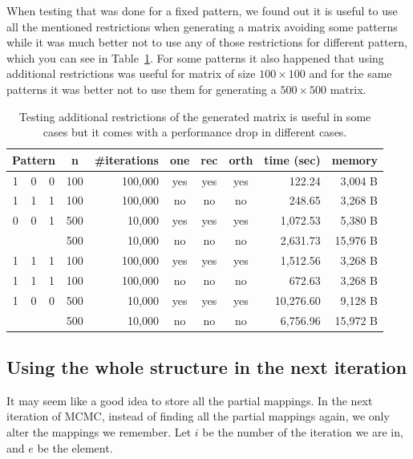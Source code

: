 When testing that was done for a fixed pattern, we found out it is useful to use all the mentioned restrictions when generating a matrix avoiding some patterns while it was much better not to use any of those restrictions for different pattern, which you can see in Table~\ref{approachestable}. For some patterns it also happened that using additional restrictions was useful for matrix of size $100\times100$ and for the same patterns it was better not to use them for generating a $500\times500$ matrix.
\begin{table}[]
\centering
\begin{tabular}{|ccc|c|r|c|c|c|r|r|}
\hline
\multicolumn{3}{|c|}{\textbf{Pattern}} & \textbf{n} & \textbf{\#iterations} & \textbf{one} & \textbf{rec} & \textbf{orth} & \textbf{time (sec)} & \textbf{memory} \\ \hline
1 & 0 & 0 & 100 & 100,000 & yes & yes & yes & 122.24 & 3,004 B \\ \cline{4-10} 
1 & 1 & 1 & 100 & 100,000 & no & no & no & 248.65 & 3,268 B \\ \cline{4-10} 
0 & 0 & 1 & 500 & 10,000 & yes & yes & yes & 1,072.53 & 5,380 B \\ \cline{4-10} 
  &   &   & 500 & 10,000 & no & no & no & 2,631.73 & 15,976 B \\ \hline
1 & 1 & 1 & 100 & 100,000 & yes & yes & yes & 1,512.56 & 3,268 B \\ \cline{4-10}
1 & 1 & 1 & 100 & 100,000 & no & no & no & 672.63 & 3,268 B \\ \cline{4-10} 
1 & 0 & 0 & 500 & 10,000 & yes & yes & yes & 10,276.60 & 9,128 B \\ \cline{4-10} 
  &   &   & 500 & 10,000 & no & no & no & 6,756.96 & 15,972 B \\ \hline
\end{tabular}
\caption{Testing additional restrictions of the generated matrix is useful in some cases but it comes with a performance drop in different cases.}
\label{approachestable}
\end{table}

\subsection{Using the whole structure in the next iteration}
\label{wholestructure}
It may seem like a good idea to store all the partial mappings. In the next iteration of MCMC, instead of finding all the partial mappings again, we only alter the mappings we remember. Let $i$ be the number of the iteration we are in, and $e$ be the element.

